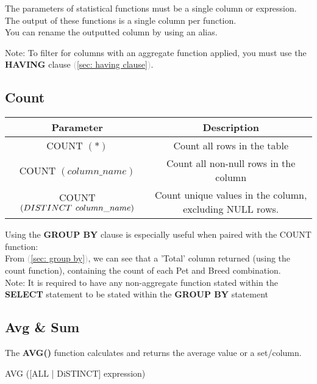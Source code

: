 The parameters of statistical functions must be a single column or expression.\\
The output of these functions is a single column per function.\\
You can rename the outputted column by using an alias.


Note: To filter for columns with an aggregate function applied, you must use the \textcolor{textgray}{\textbf{HAVING}} clause \textcolor{darkgray}{(\ref{sec: having clause})}.

\subsection{Count}
\begin{center}
    \begin{tabular}{c|c}
        Parameter & Description \\
        \hline
        COUNT $(*)$ & Count all rows in the table\\
        COUNT $(column\_name)$ & Count all non-null rows in the column\\
        COUNT $(DISTINCT \hspace{0.15cm}column\_name)$ & Count unique values in the column, excluding NULL rows.
        \\[0.45cm]

    \end{tabular}
\end{center}

Using the \textcolor{textgray}{\textbf{GROUP BY}} clause is especially useful when paired with the COUNT function:\\[0.3cm]
From \textcolor{darkgray}{(\ref{sec: group by})}, we can see that a 'Total' column returned (using the count function), containing the count of each Pet and Breed combination.\\[0.3cm]
Note: It is required to have any non-aggregate function stated within the \textcolor{textgray}{\textbf{SELECT}} statement to be stated within the \textcolor{textgray}{\textbf{GROUP BY}} statement


\subsection{Avg \& Sum}
The \textbf{AVG()} function calculates and returns the average value or a set/column.

\begin{center}
    AVG ([ALL | DiSTINCT] expression)
\end{center}


